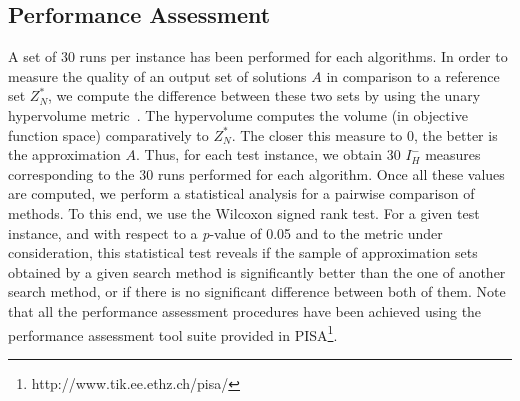 \documentclass{llncs}
\begin{document}
\subsection{Performance Assessment}
 A set of 30 runs per instance has been performed for each algorithms.
In order to measure the quality of an output set of solutions $A$ in comparison to a reference set $Z^*_N$, we compute the difference between these two sets by using the unary hypervolume
metric~\cite{Zitzler2004}. The hypervolume computes the volume (in objective function space) comparatively to $Z^*_N$. The closer this measure to 0, the better is the approximation $A$.
Thus, for each test instance, we obtain 30 $I^-_H $ measures  corresponding to the 30  runs performed for each algorithm. 
Once all these values are computed, we perform a statistical analysis for a pairwise comparison of methods. To this end, we use the Wilcoxon signed rank test. For a given
test instance, and with respect to a \textit{p}-value of 0.05 and to the metric under consideration, this statistical test reveals if
the sample of approximation sets obtained by a given search method is significantly better than the one of another search
method, or if there is no significant difference between both of them. Note that all the performance assessment procedures have been achieved using
the performance assessment tool suite provided in PISA\footnote{http://www.tik.ee.ethz.ch/pisa/}.%
\end{document}
